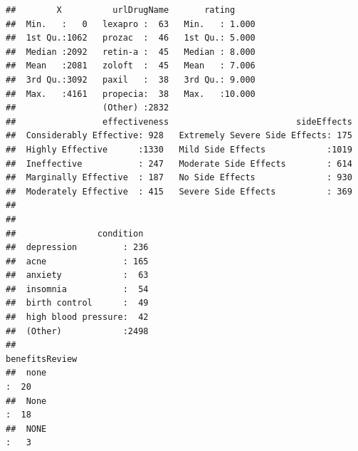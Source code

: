 \documentclass[spanish,]{article}
\begin{document}
\begin{verbatim}
##        X          urlDrugName       rating      
##  Min.   :   0   lexapro :  63   Min.   : 1.000  
##  1st Qu.:1062   prozac  :  46   1st Qu.: 5.000  
##  Median :2092   retin-a :  45   Median : 8.000  
##  Mean   :2081   zoloft  :  45   Mean   : 7.006  
##  3rd Qu.:3092   paxil   :  38   3rd Qu.: 9.000  
##  Max.   :4161   propecia:  38   Max.   :10.000  
##                 (Other) :2832                   
##                 effectiveness                         sideEffects  
##  Considerably Effective: 928   Extremely Severe Side Effects: 175  
##  Highly Effective      :1330   Mild Side Effects            :1019  
##  Ineffective           : 247   Moderate Side Effects        : 614  
##  Marginally Effective  : 187   No Side Effects              : 930  
##  Moderately Effective  : 415   Severe Side Effects          : 369  
##                                                                    
##                                                                    
##                condition   
##  depression         : 236  
##  acne               : 165  
##  anxiety            :  63  
##  insomnia           :  54  
##  birth control      :  49  
##  high blood pressure:  42  
##  (Other)            :2498  
##                                                                                                                                                                                                                                                                                                                          benefitsReview
##  none                                                                                                                                                                                                                                                                                                                           :  20  
##  None                                                                                                                                                                                                                                                                                                                           :  18  
##  NONE                                                                                                                                                                                                                                                                                                                           :   3  

\end{verbatim}
\end{document}
